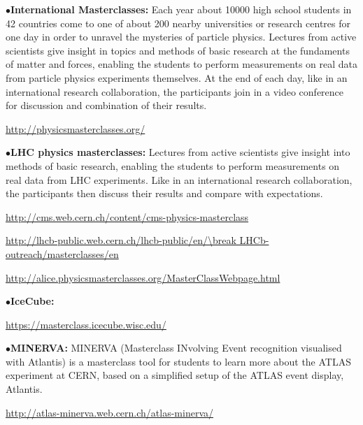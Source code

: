 



\medskip

\item{$\bullet$}{\bf International Masterclasses:}
Each year about 10000 high school students in 42 countries come to one of about 200 nearby universities or research centres for one day in order to unravel the mysteries of particle physics. Lectures from active scientists give insight in topics and methods of basic research at the fundaments of matter and forces, enabling the students to perform measurements on real data from particle physics experiments themselves. At the end of each day, like in an international research collaboration, the participants join in a video conference for discussion and combination of their results.
	\item{}\qquad\url{http://physicsmasterclasses.org/}

\medskip

\item{$\bullet$}{\bf LHC physics masterclasses:}
Lectures from active scientists give insight into methods of basic research, enabling the students to perform measurements on real data from LHC experiments. Like in an international research collaboration, the participants then discuss their results and compare with expectations.
	\item{}\qquad\url{http://cms.web.cern.ch/content/cms-physics-masterclass}
	\item{}\qquad\url{http://lhcb-public.web.cern.ch/lhcb-public/en/\break LHCb-outreach/masterclasses/en}
	\item{}\qquad\url{http://alice.physicsmasterclasses.org/MasterClassWebpage.html}

\medskip

\item{$\bullet$}{\bf IceCube:}
	\item{}\qquad\url{https://masterclass.icecube.wisc.edu/}

\medskip

\item{$\bullet$}{\bf MINERVA:}
MINERVA (Masterclass INvolving Event recognition visualised with Atlantis) is a masterclass tool for students to learn more about the ATLAS experiment at CERN, based on a simplified setup of the ATLAS event display, Atlantis.
	\item{}\qquad\url{http://atlas-minerva.web.cern.ch/atlas-minerva/}

